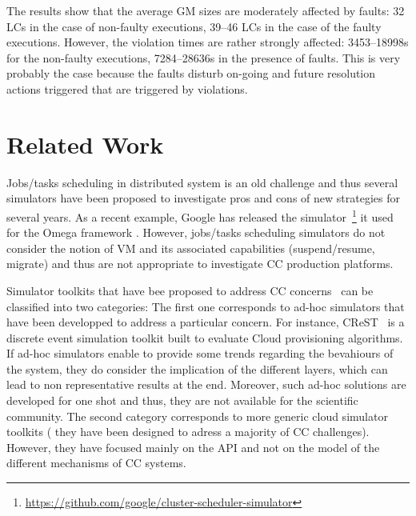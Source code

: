 The results show that the average GM sizes are moderately affected by
faults: 32 LCs in the case of non-faulty executions, 39--46 LCs in the
case of the faulty executions. However, the violation times are rather
strongly affected: 3453--18998s for the non-faulty executions,
7284--28636s in the presence of faults. This is very probably the case
because the faults disturb on-going and future resolution actions
triggered that are triggered by violations.



\section{Related Work}
\label{sec:related}

Jobs/tasks scheduling in distributed
system is an old challenge and thus several simulators have been
proposed to investigate pros and cons of new strategies for several years. As a recent
example, Google has released the simulator~\footnote{\href{https://github.com/google/cluster-scheduler-simulator}{https://github.com/google/cluster-scheduler-simulator}} it used for the Omega
framework \cite{schwarzkopf:2013}. However, jobs/tasks scheduling
simulators do not consider the notion of VM and its associated
capabilities (suspend/resume, migrate) and thus are not appropriate
to investigate CC production platforms.

Simulator toolkits that have bee proposed to address CC
concerns~\cite{cloudsim, CC13, DGSIM,  greencloud,
  icancloud} can be classified into two categories: The first
one corresponds to ad-hoc simulators that have been developped to
address a particular concern. For instance, CReST~\cite{CC13} is a
discrete event simulation toolkit built to evaluate Cloud provisioning
algorithms. If ad-hoc simulators enable to provide some trends
regarding the bevahiours of the system, they do consider the
implication of the different layers, which can lead to non
representative results at the end. Moreover, such ad-hoc solutions are
developed for one shot and thus, they are not available for the
scientific community. The second category \cite{cloudsim, greencloud,
  icancloud} corresponds to more generic cloud simulator toolkits (\ie
they have been designed to adress a majority of CC
challenges). However, they have focused mainly on the API and not on
the model of the different mechanisms of CC systems.

